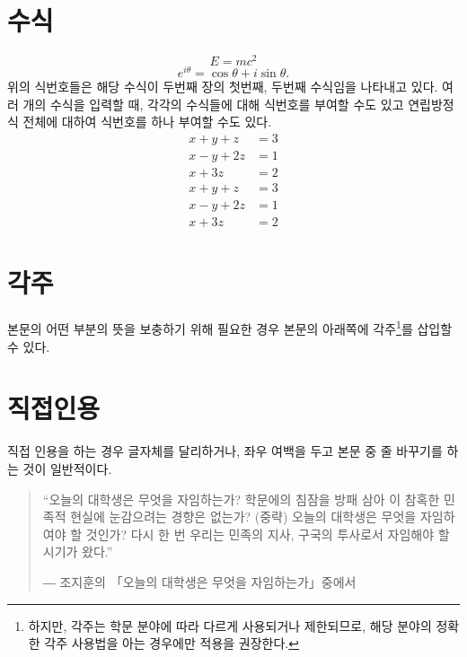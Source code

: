 \documentclass[11pt]{report}
\begin{document}
\section{수식}\label{sec:equation}

\begin{equation}
E=mc^2
\end{equation}
\begin{equation}
e^{i\theta}=\cos\theta+i\sin\theta.
\end{equation}
위의 식번호들은 해당 수식이 두번째 장의 첫번째, 두번째 수식임을 나타내고 있다. 여러 개의 수식을 입력할 때, 각각의 수식들에 대해 식번호를 부여할 수도 있고 연립방정식 전체에 대하여 식번호를 하나 부여할 수도 있다.
\begin{align}
x+y+z&=3\\
x-y+2z&=1\\
x+3z&=2
\end{align}
\begin{equation}
\begin{aligned}
x+y+z&=3\\
x-y+2z&=1\\
x+3z&=2
\end{aligned}
\end{equation}

\section{각주}\label{sec:footnotes}

본문의 어떤 부분의 뜻을 보충하기 위해 필요한 경우 본문의 아래쪽에 각주\footnote{하지만, 각주는 학문 분야에 따라 다르게 사용되거나 제한되므로, 해당 분야의 정확한 각주 사용법을 아는 경우에만 적용을 권장한다.}를 삽입할 수 있다.

\section{직접인용}\label{sec:quotation}
직접 인용을 하는 경우 글자체를 달리하거나, 좌우 여백을 두고 본문 중 줄 바꾸기를 하는 것이 일반적이다.\par
\bigskip

\begin{quote}
“오늘의 대학생은 무엇을 자임하는가? 학문에의 침잠을 방패 삼아 이 참혹한 민족적 현실에 눈감으려는 경향은 없는가? (중략) 오늘의 대학생은 무엇을 자임하여야 할 것인가? 다시 한 번 우리는 민족의 지사, 구국의 투사로서 자임해야 할 시기가 왔다.” \par
― 조지훈의  「오늘의 대학생은 무엇을 자임하는가」중에서 
\end{quote}
\bigskip
\end{document}
